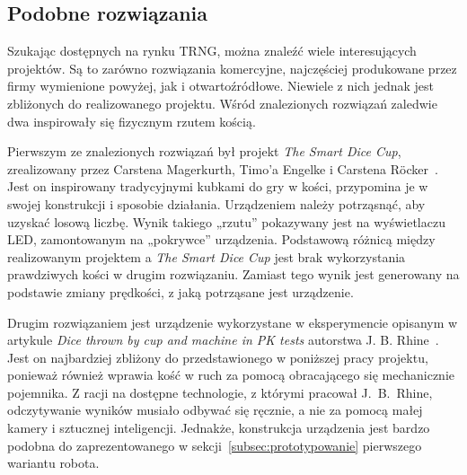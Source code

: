 \subsection{Podobne rozwiązania}\label{sec:podobne-rozwiazania}

Szukając dostępnych na rynku TRNG, można znaleźć wiele interesujących projektów. Są to zarówno rozwiązania komercyjne, 
najczęściej produkowane przez firmy wymienione powyżej, jak i otwartoźródłowe. Niewiele z nich jednak jest zbliżonych 
do realizowanego projektu. Wśród znalezionych rozwiązań zaledwie dwa inspirowały się fizycznym rzutem kością.

Pierwszym ze znalezionych rozwiązań był projekt \textit{The Smart Dice Cup}, zrealizowany przez Carstena Magerkurth,
Timo'a Engelke i Carstena Röcker~\cite{SmartDice}.
Jest on inspirowany tradycyjnymi kubkami do gry w kości, przypomina je w swojej konstrukcji i sposobie działania.
Urządzeniem należy potrząsnąć, aby uzyskać losową liczbę.
Wynik takiego „rzutu” pokazywany jest na wyświetlaczu LED, zamontowanym na „pokrywce” urządzenia.
Podstawową różnicą między realizowanym projektem a \textit{The Smart Dice Cup} jest brak wykorzystania prawdziwych
kości w drugim rozwiązaniu.
Zamiast tego wynik jest generowany na podstawie zmiany prędkości, z jaką potrząsane jest urządzenie.

Drugim rozwiązaniem jest urządzenie wykorzystane w eksperymencie opisanym w artykule \textit{Dice thrown by cup and machine in PK tests} autorstwa J. B. Rhine~\cite{betoniarka43}.
Jest on najbardziej zbliżony do przedstawionego w poniższej pracy projektu, ponieważ również wprawia kość w
ruch za pomocą obracającego się mechanicznie pojemnika.
Z racji na dostępne technologie, z którymi pracował J.~B.~Rhine, odczytywanie wyników musiało odbywać się ręcznie, a nie za pomocą małej kamery i sztucznej inteligencji.
Jednakże, konstrukcja urządzenia jest bardzo podobna do zaprezentowanego w sekcji~\ref{subsec:prototypowanie} pierwszego wariantu robota.